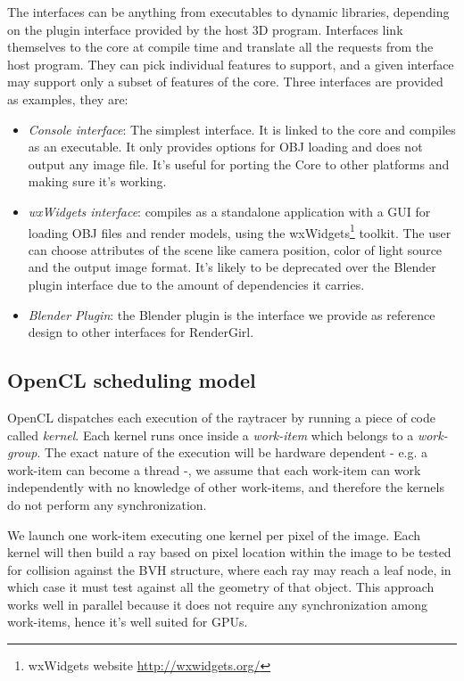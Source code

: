 \documentclass{vgtc}
\begin{document}
The interfaces can be anything from executables to dynamic libraries,
depending on the plugin interface provided by the host 3D
program. Interfaces link themselves to the core at compile time and translate
all the requests from the host program. They can pick individual
features to support, and a given interface may support only a subset
of features of the core. Three interfaces are provided as examples,
they are:

\begin{itemize}
\item \emph{Console interface}: The simplest interface. It is linked to
  the core and compiles as an executable. It only provides options for
  OBJ loading and does not output any image file. It's useful for
  porting the Core to other platforms and making sure it's working.
\item \emph{wxWidgets interface}: compiles as a standalone
  application with a GUI for loading OBJ files and render models,
  using the wxWidgets\footnote{wxWidgets website
    \url{http://wxwidgets.org/}} toolkit. The user can choose
  attributes of the scene like camera position, color of light source
  and the output image format. It's likely to be deprecated over the
  Blender plugin interface due to the amount of dependencies it
  carries.
\item \emph{Blender Plugin}: the Blender plugin is the interface we
  provide as reference design to other interfaces for RenderGirl.
\end{itemize}

\subsection{OpenCL scheduling model}

OpenCL dispatches each execution of the raytracer by running a piece of
code called \emph{kernel}. Each kernel runs once inside a
\emph{work-item} which belongs to a \emph{work-group}. The exact
nature of the execution will be hardware dependent - e.g. a work-item
can become a thread -, we assume that each work-item can work
independently with no knowledge of other work-items, and therefore the
kernels do not perform any synchronization.

We launch one work-item executing one kernel per pixel of the
image. Each kernel will then build a ray based on pixel location
within the image to be tested for collision against the BVH structure,
where each ray may reach a leaf node, in which case it must test
against all the geometry of that object. This approach works well in
parallel because it does not require any synchronization among
work-items, hence it's well suited for GPUs.
\end{document}
